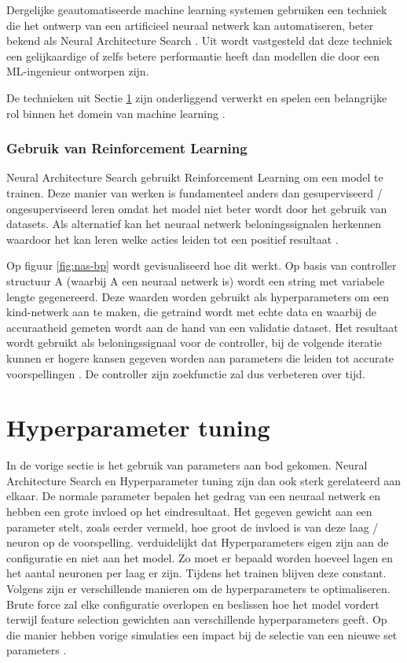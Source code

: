 Dergelijke geautomatiseerde machine learning systemen gebruiken een techniek die het ontwerp van een artificieel neuraal netwerk kan automatiseren, beter bekend als Neural Architecture Search \autocite{Elsken2019}. Uit \textcite{ZophL2016} wordt vastgesteld dat deze techniek een gelijkaardige of zelfs betere performantie heeft dan modellen die door een ML-ingenieur ontworpen zijn.

De technieken uit Sectie \ref{sec:hyperparameter-tuning} zijn onderliggend verwerkt en spelen een belangrijke rol binnen het domein van machine learning \autocite{ZophL2016}.

\subsubsection{Gebruik van Reinforcement Learning}

Neural Architecture Search gebruikt Reinforcement Learning om een model te trainen. Deze manier van werken is fundamenteel anders dan gesuperviseerd / ongesuperviseerd leren omdat het model niet beter wordt door het gebruik van datasets. Als alternatief kan het neuraal netwerk beloningssignalen herkennen waardoor het kan leren welke acties leiden tot een positief resultaat \autocite{Lievens2019}.

Op figuur \ref{fig:nas-bp} wordt gevisualiseerd hoe dit werkt. Op basis van controller structuur A (waarbij A een neuraal netwerk is) wordt een string met variabele lengte gegenereerd. Deze waarden worden gebruikt als hyperparameters om een kind-netwerk aan te maken, die getraind wordt met echte data en waarbij de accuraatheid gemeten wordt aan de hand van een validatie dataset. Het resultaat wordt gebruikt als beloningssignaal voor de controller, bij de volgende iteratie kunnen er hogere kansen gegeven worden aan parameters die leiden tot accurate voorspellingen \autocite{ZophL2016}. De controller zijn zoekfunctie zal dus verbeteren over tijd.

\section{Hyperparameter tuning}
\label{sec:hyperparameter-tuning}

In de vorige sectie is het gebruik van parameters aan bod gekomen. Neural Architecture Search en Hyperparameter tuning zijn dan ook sterk gerelateerd aan elkaar. De normale parameter bepalen het gedrag van een neuraal netwerk en hebben een grote invloed op het eindresultaat. Het gegeven gewicht aan een parameter stelt, zoals eerder vermeld, hoe groot de invloed is van deze laag / neuron op de voorspelling. \textcite{GoogleHT2020} verduidelijkt dat Hyperparameters eigen zijn aan de configuratie en niet aan het model. Zo moet er bepaald worden hoeveel lagen en het aantal neuronen per laag er zijn. Tijdens het trainen blijven deze constant. Volgens \textcite{Brust2019} zijn er verschillende manieren om de hyperparameters te optimaliseren. Brute force zal elke configuratie overlopen en beslissen hoe het model vordert terwijl feature selection gewichten aan verschillende hyperparameters geeft. Op die manier hebben vorige simulaties een impact bij de selectie van een nieuwe set parameters \autocite{Claesen2015}.

